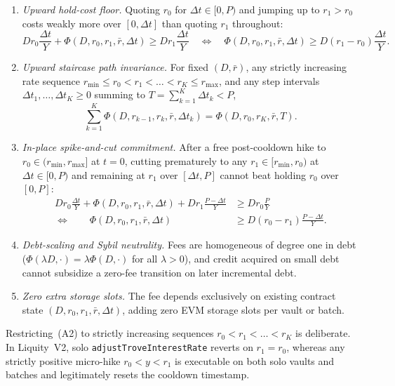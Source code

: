 \begin{enumerate}[label=(A\arabic*), leftmargin=2.8em, itemsep=3pt]
\item \emph{Upward hold-cost floor.} Quoting $r_0$ for $\Delta t \in [0, P)$ and jumping up to $r_1 > r_0$ costs weakly more over $[0, \Delta t]$ than quoting $r_1$ throughout:
\[
D r_0 \frac{\Delta t}{Y} + \Phi(D, r_0, r_1, \bar{r}, \Delta t) \ge D r_1 \frac{\Delta t}{Y} \quad \Longleftrightarrow \quad \Phi(D, r_0, r_1, \bar{r}, \Delta t) \ge D(r_1 - r_0)\frac{\Delta t}{Y}.
\]
\item \emph{Upward staircase path invariance.} For fixed $(D, \bar{r})$, any strictly increasing rate sequence $r_{\min} \le r_0 < r_1 < \dots < r_K \le r_{\max}$, and any step intervals $\Delta t_1, \dots, \Delta t_K \ge 0$ summing to $T = \sum_{k=1}^K \Delta t_k < P$,
\[
\sum_{k=1}^K \Phi(D, r_{k-1}, r_k, \bar{r}, \Delta t_k) = \Phi(D, r_0, r_K, \bar{r}, T).
\]
\item \emph{In-place spike-and-cut commitment.} After a free post-cooldown hike to $r_0 \in (r_{\min}, r_{\max}]$ at $t = 0$, cutting prematurely to any $r_1 \in [r_{\min}, r_0)$ at $\Delta t \in [0, P)$ and remaining at $r_1$ over $[\Delta t, P]$ cannot beat holding $r_0$ over $[0, P]$:
\begin{align*}
D r_0 \frac{\Delta t}{Y} + \Phi(D, r_0, r_1, \bar{r}, \Delta t) + D r_1 \frac{P - \Delta t}{Y} &\ge D r_0 \frac{P}{Y} \\
\Longleftrightarrow \qquad \Phi(D, r_0, r_1, \bar{r}, \Delta t) &\ge D(r_0 - r_1)\frac{P - \Delta t}{Y}.
\end{align*}
\item \emph{Debt-scaling and Sybil neutrality.} Fees are homogeneous of degree one in debt ($\Phi(\lambda D, \cdot) = \lambda \Phi(D, \cdot)$ for all $\lambda > 0$), and credit acquired on small debt cannot subsidize a zero-fee transition on later incremental debt.
\item \emph{Zero extra storage slots.} The fee depends exclusively on existing contract state $(D, r_0, r_1, \bar{r}, \Delta t)$, adding zero EVM storage slots per vault or batch.
\end{enumerate}

Restricting~(A2) to strictly increasing sequences $r_0 < r_1 < \dots < r_K$ is deliberate. In Liquity~V2, solo \texttt{adjustTroveInterestRate} reverts on $r_1 = r_0$, whereas any strictly positive micro-hike $r_0 < y < r_1$ is executable on both solo vaults and batches and legitimately resets the cooldown timestamp.

